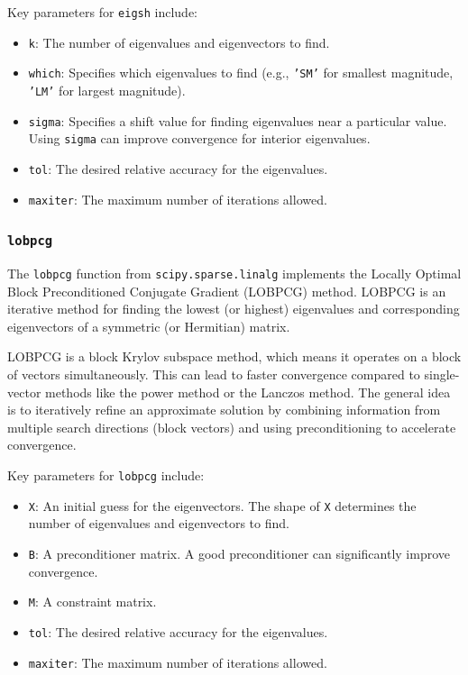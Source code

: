 \documentclass{article}
\begin{document}
Key parameters for \texttt{eigsh} include:
\begin{itemize}
    \item \texttt{k}: The number of eigenvalues and eigenvectors to find.
    \item \texttt{which}: Specifies which eigenvalues to find (e.g., \texttt{'SM'} for smallest magnitude, \texttt{'LM'} for largest magnitude).
    \item \texttt{sigma}: Specifies a shift value for finding eigenvalues near a particular value. Using \texttt{sigma} can improve convergence for interior eigenvalues.
    \item \texttt{tol}: The desired relative accuracy for the eigenvalues.
    \item \texttt{maxiter}: The maximum number of iterations allowed.
\end{itemize}

\subsubsection{\texttt{lobpcg}}
The \texttt{lobpcg} function from \texttt{scipy.sparse.linalg} implements the Locally Optimal Block Preconditioned Conjugate Gradient (LOBPCG) method. LOBPCG is an iterative method for finding the lowest (or highest) eigenvalues and corresponding eigenvectors of a symmetric (or Hermitian) matrix.

LOBPCG is a block Krylov subspace method, which means it operates on a block of vectors simultaneously. This can lead to faster convergence compared to single-vector methods like the power method or the Lanczos method. The general idea is to iteratively refine an approximate solution by combining information from multiple search directions (block vectors) and using preconditioning to accelerate convergence.

Key parameters for \texttt{lobpcg} include:
\begin{itemize}
    \item \texttt{X}: An initial guess for the eigenvectors. The shape of \texttt{X} determines the number of eigenvalues and eigenvectors to find.
    \item \texttt{B}: A preconditioner matrix. A good preconditioner can significantly improve convergence.
    \item \texttt{M}: A constraint matrix.
    \item \texttt{tol}: The desired relative accuracy for the eigenvalues.
    \item \texttt{maxiter}: The maximum number of iterations allowed.
\end{itemize}
\end{document}
